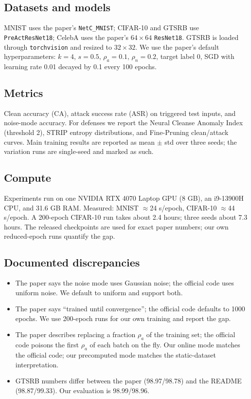 \documentclass[conference]{IEEEtran}
\begin{document}
\subsection{Datasets and models}
MNIST uses the paper's \texttt{NetC\_MNIST}; CIFAR-10 and GTSRB use
\texttt{PreActResNet18}; CelebA uses the paper's $64\times64$ \texttt{ResNet18}.
GTSRB is loaded through \texttt{torchvision} and resized to $32\times32$. We
use the paper's default hyperparameters: $k=4$, $s=0.5$, $\rho_a=0.1$,
$\rho_n=0.2$, target label 0, SGD with learning rate 0.01 decayed by 0.1 every
100 epochs.

\subsection{Metrics}
Clean accuracy (CA), attack success rate (ASR) on triggered test inputs, and
noise-mode accuracy. For defenses we report the Neural Cleanse Anomaly Index
(threshold 2), STRIP entropy distributions, and Fine-Pruning clean/attack
curves. Main training results are reported as mean $\pm$ std over three seeds;
the variation runs are single-seed and marked as such.

\subsection{Compute}
Experiments run on one NVIDIA RTX 4070 Laptop GPU (8 GB), an i9-13900H CPU,
and 31.6 GB RAM. Measured: MNIST $\approx$24 s/epoch, CIFAR-10 $\approx$44
s/epoch. A 200-epoch CIFAR-10 run takes about 2.4 hours; three seeds about
7.3 hours. The released checkpoints are used for exact paper numbers; our own
reduced-epoch runs quantify the gap.

\subsection{Documented discrepancies}
\begin{itemize}
  \item The paper says the noise mode uses Gaussian noise; the official code
        uses uniform noise. We default to uniform and support both.
  \item The paper says ``trained until convergence''; the official code
        defaults to 1000 epochs. We use 200-epoch runs for our own training and
        report the gap.
  \item The paper describes replacing a fraction $\rho_a$ of the training set;
        the official code poisons the first $\rho_a$ of each batch on the fly.
        Our online mode matches the official code; our precomputed mode matches
        the static-dataset interpretation.
  \item GTSRB numbers differ between the paper (98.97/98.78) and the README
        (98.87/99.33). Our evaluation is 98.99/98.96.
\end{itemize}
\end{document}
